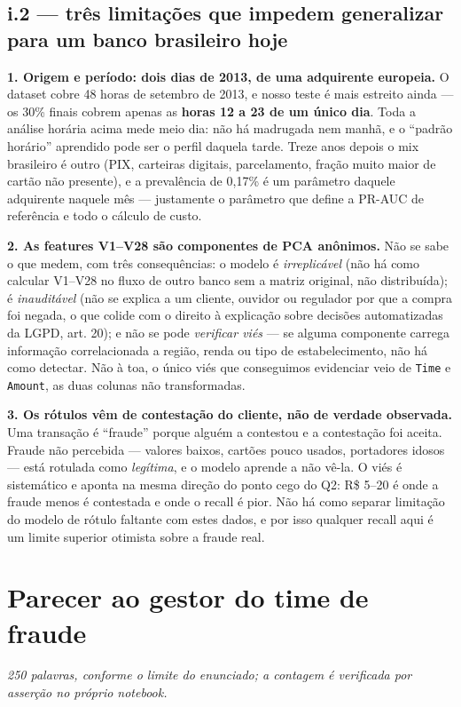 \documentclass[10pt,a4paper]{article}
\newcommand{\resp}[1]{\subsection{#1}}
\begin{document}
\resp{i.2 --- três limitações que impedem generalizar para um banco brasileiro hoje}

\textbf{1. Origem e período: dois dias de 2013, de uma adquirente europeia.} O dataset cobre 48
horas de setembro de 2013, e nosso teste é mais estreito ainda --- os 30\% finais cobrem apenas
as \textbf{horas 12 a 23 de um único dia}. Toda a análise horária acima mede meio dia: não há
madrugada nem manhã, e o ``padrão horário'' aprendido pode ser o perfil daquela tarde. Treze
anos depois o mix brasileiro é outro (PIX, carteiras digitais, parcelamento, fração muito maior
de cartão não presente), e a prevalência de 0,17\% é um parâmetro daquele adquirente naquele
mês --- justamente o parâmetro que define a PR-AUC de referência e todo o cálculo de custo.

\textbf{2. As features V1--V28 são componentes de PCA anônimos.} Não se sabe o que medem, com
três consequências: o modelo é \emph{irreplicável} (não há como calcular V1--V28 no fluxo de
outro banco sem a matriz original, não distribuída); é \emph{inauditável} (não se explica a um
cliente, ouvidor ou regulador por que a compra foi negada, o que colide com o direito à
explicação sobre decisões automatizadas da LGPD, art. 20); e não se pode \emph{verificar viés}
--- se alguma componente carrega informação correlacionada a região, renda ou tipo de
estabelecimento, não há como detectar. Não à toa, o único viés que conseguimos evidenciar veio
de \texttt{Time} e \texttt{Amount}, as duas colunas não transformadas.

\textbf{3. Os rótulos vêm de contestação do cliente, não de verdade observada.} Uma transação é
``fraude'' porque alguém a contestou e a contestação foi aceita. Fraude não percebida ---
valores baixos, cartões pouco usados, portadores idosos --- está rotulada como \emph{legítima},
e o modelo aprende a não vê-la. O viés é sistemático e aponta na mesma direção do ponto cego do
Q2: R\$ 5--20 é onde a fraude menos é contestada e onde o recall é pior. Não há como separar
limitação do modelo de rótulo faltante com estes dados, e por isso qualquer recall aqui é um
limite superior otimista sobre a fraude real.

\section{Parecer ao gestor do time de fraude}

{\small\itshape 250 palavras, conforme o limite do enunciado; a contagem é verificada por
asserção no próprio notebook.}
\end{document}
